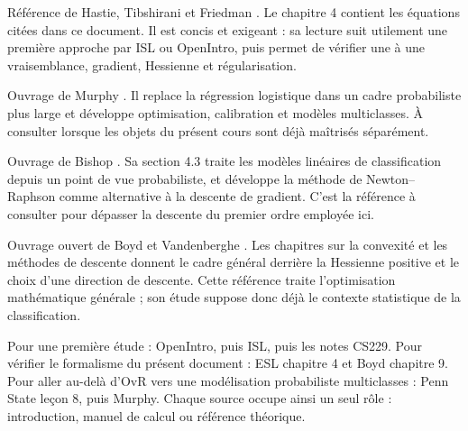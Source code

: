 \begin{description}[style=nextline,leftmargin=0pt]
  \item[\href{https://hastie.su.domains/ElemStatLearn/}{The Elements of
  Statistical Learning}] Référence de Hastie, Tibshirani et Friedman
  \cite{hastie2009}. Le chapitre 4 contient les équations citées dans ce document.
  Il est concis et exigeant : sa lecture suit utilement une première approche par
  ISL ou OpenIntro, puis permet de vérifier une à une vraisemblance, gradient,
  Hessienne et régularisation.

  \item[\href{https://probml.github.io/pml-book/book1.html}{Probabilistic Machine
  Learning: An Introduction}] Ouvrage de Murphy \cite{murphy2022}. Il replace la
  régression logistique dans un cadre probabiliste plus large et développe
  optimisation, calibration et modèles multiclasses. À consulter lorsque les
  objets du présent cours sont déjà maîtrisés séparément.

  \item[\href{https://www.microsoft.com/en-us/research/publication/pattern-recognition-machine-learning/}{Pattern
  Recognition and Machine Learning}] Ouvrage de Bishop \cite{bishop2006}. Sa
  section 4.3 traite les modèles linéaires de classification depuis un point de
  vue probabiliste, et développe la méthode de Newton--Raphson comme alternative
  à la descente de gradient. C'est la référence à consulter pour dépasser la
  descente du premier ordre employée ici.

  \item[\href{https://web.stanford.edu/~boyd/cvxbook/}{Convex Optimization}]
  Ouvrage ouvert de Boyd et Vandenberghe \cite{boyd2004}. Les chapitres sur la
  convexité et les méthodes de descente donnent le cadre général derrière la
  Hessienne positive et le choix d'une direction de descente. Cette référence
  traite l'optimisation mathématique générale ; son étude suppose donc déjà le
  contexte statistique de la classification.
\end{description}

\begin{resultat}
Pour une première étude : OpenIntro, puis ISL, puis les notes CS229. Pour vérifier
le formalisme du présent document : ESL chapitre 4 et Boyd chapitre 9. Pour aller
au-delà d'OvR vers une modélisation probabiliste multiclasses : Penn State leçon
8, puis Murphy. Chaque source occupe ainsi un seul rôle : introduction, manuel de
calcul ou référence théorique.
\end{resultat}
